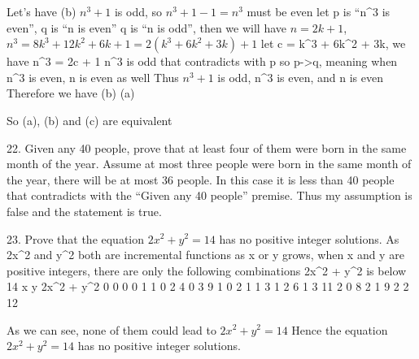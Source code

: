 \documentclass{article}
\begin{document}
Let's have (b) $n^3+1$ is odd, so $n^3 + 1 - 1 = n^3$ must be even
let p is ``n^3 is even'', q is ``n is even''
\lnot q is ``n is odd'', then we will have $n = 2k+1$, $n^3 = 8k^3 + 12k^2 + 6k + 1 = 2(k^3 + 6k^2 + 3k) + 1$
let c = k^3 + 6k^2 + 3k, we have n^3 = 2c + 1
n^3 is odd that contradicts with p
so p->q, meaning when n^3 is even, n is even as well
Thus $n^3+1$ is odd, n^3 is even, and n is even
Therefore we have (b) \to (a)

So (a), (b) and (c) are equivalent

22. Given any 40 people, prove that at least four of them were born in the same month of the year.
Assume at most three people were born in the same month of the year, there will be at most 36 people. In this case it is less than 40 people that contradicts with the ``Given any 40 people'' premise. 
Thus my assumption is false and the statement is true.

23. Prove that the equation $2x^2+y^2=14$ has no positive integer solutions.
As 2x^2 and y^2 both are incremental functions as x or y grows,
when x and y are positive integers, there are only the following combinations 2x^2 + y^2 is below 14
x  y  2x^2 + y^2
0  0   0
0  1   1
0  2   4
0  3   9
1  0   2
1  1   3
1  2   6
1  3  11
2  0   8
2  1   9
2  2  12

As we can see, none of them could lead to $2x^2+y^2=14$
Hence the equation $2x^2+y^2=14$ has no positive integer solutions.
\end{document}

